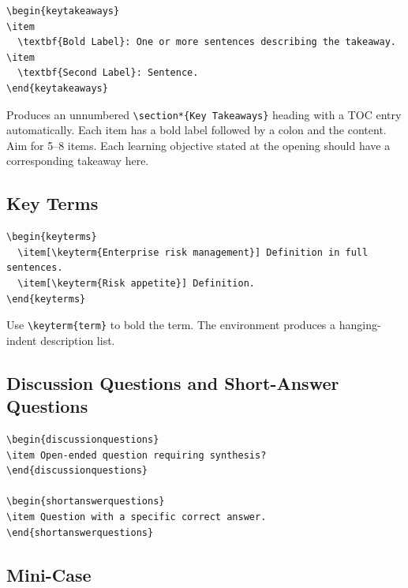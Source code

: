 \documentclass[11pt,openany]{book}
\newcommand{\code}[1]{\texttt{\small #1}}
\begin{document}
\begin{lstlisting}
\begin{keytakeaways}
\item
  \textbf{Bold Label}: One or more sentences describing the takeaway.
\item
  \textbf{Second Label}: Sentence.
\end{keytakeaways}
\end{lstlisting}

Produces an unnumbered \code{\textbackslash section*\{Key Takeaways\}} heading with a TOC entry automatically. Each item has a bold label followed by a colon and the content. Aim for 5--8 items. Each learning objective stated at the opening should have a corresponding takeaway here.

\subsection{Key Terms}

\begin{lstlisting}
\begin{keyterms}
  \item[\keyterm{Enterprise risk management}] Definition in full sentences.
  \item[\keyterm{Risk appetite}] Definition.
\end{keyterms}
\end{lstlisting}

Use \code{\textbackslash keyterm\{term\}} to bold the term. The environment produces a hanging-indent description list.

\subsection{Discussion Questions and Short-Answer Questions}

\begin{lstlisting}
\begin{discussionquestions}
\item Open-ended question requiring synthesis?
\end{discussionquestions}

\begin{shortanswerquestions}
\item Question with a specific correct answer.
\end{shortanswerquestions}
\end{lstlisting}

\subsection{Mini-Case}
\end{document}
